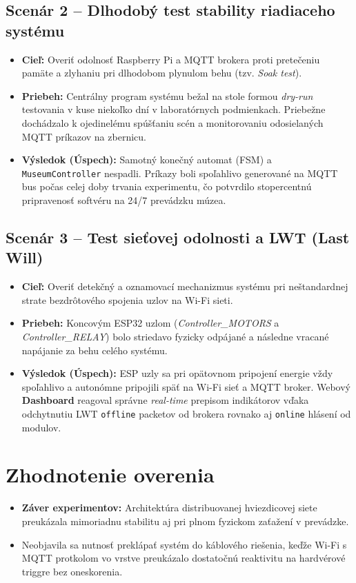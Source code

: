 \subsection{Scenár 2 -- Dlhodobý test stability riadiaceho systému}
\begin{itemize}
    \item \textbf{Cieľ:} Overiť odolnosť Raspberry Pi a MQTT brokera proti pretečeniu pamäte a zlyhaniu pri dlhodobom plynulom behu (tzv. \textit{Soak test}).
    \item \textbf{Priebeh:} Centrálny program systému bežal na stole formou \textit{dry-run} testovania v kuse niekoľko dní v laboratórnych podmienkach. Priebežne dochádzalo k ojedinelému spúšťaniu scén a monitorovaniu odosielaných MQTT príkazov na zbernicu.
    \item \textbf{Výsledok (Úspech):} Samotný konečný automat (FSM) a \texttt{MuseumController} nespadli. Príkazy boli spoľahlivo generované na MQTT bus počas celej doby trvania experimentu, čo potvrdilo stopercentnú pripravenosť softvéru na 24/7 prevádzku múzea.
\end{itemize}

\subsection{Scenár 3 -- Test sieťovej odolnosti a LWT (Last Will)}
\begin{itemize}
    \item \textbf{Cieľ:} Overiť detekčný a oznamovací mechanizmus systému pri neštandardnej strate bezdrôtového spojenia uzlov na Wi-Fi sieti.
    \item \textbf{Priebeh:} Koncovým ESP32 uzlom (\textit{Controller\_MOTORS} a \textit{Controller\_RELAY}) bolo striedavo fyzicky odpájané a následne vracané napájanie za behu celého systému.
    \item \textbf{Výsledok (Úspech):} ESP uzly sa pri opätovnom pripojení energie vždy spoľahlivo a autonómne pripojili späť na Wi-Fi sieť a MQTT broker. Webový \textbf{Dashboard} reagoval správne \textit{real-time} prepisom indikátorov vďaka odchytnutiu LWT \texttt{offline} packetov od brokera rovnako aj \texttt{online} hlásení od modulov.
\end{itemize}

\section{Zhodnotenie overenia}
\label{VysledkyZhodnotenie}

\begin{itemize}
    \item \textbf{Záver experimentov:} Architektúra distribuovanej hviezdicovej siete preukázala mimoriadnu stabilitu aj pri plnom fyzickom zaťažení v prevádzke.
    \item Neobjavila sa nutnosť preklápať systém do káblového riešenia, keďže Wi-Fi s MQTT protkolom vo vrstve preukázalo dostatočnú reaktivitu na hardvérové triggre bez oneskorenia. 
\end{itemize}
